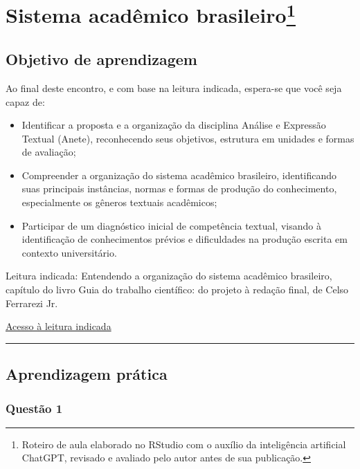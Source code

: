 \documentclass[
]{book}
\begin{document}
\chapter[Sistema acadêmico brasileiro]{\texorpdfstring{Sistema acadêmico brasileiro\footnote{Roteiro de aula elaborado no RStudio com o auxílio da inteligência artificial ChatGPT, revisado e avaliado pelo autor antes de sua publicação.}}{Sistema acadêmico brasileiro}}\label{sistema-acaduxeamico-brasileiro1}

\section{Objetivo de aprendizagem}\label{objetivo-de-aprendizagem}

Ao final deste encontro, e com base na leitura indicada, espera-se que você seja capaz de:

\begin{itemize}
\item
  Identificar a proposta e a organização da disciplina Análise e Expressão Textual (Anete), reconhecendo seus objetivos, estrutura em unidades e formas de avaliação;
\item
  Compreender a organização do sistema acadêmico brasileiro, identificando suas principais instâncias, normas e formas de produção do conhecimento, especialmente os gêneros textuais acadêmicos;
\item
  Participar de um diagnóstico inicial de competência textual, visando à identificação de conhecimentos prévios e dificuldades na produção escrita em contexto universitário.
\end{itemize}

Leitura indicada:
Entendendo a organização do sistema acadêmico brasileiro, capítulo do livro Guia do trabalho científico: do projeto à redação final, de Celso Ferrarezi Jr.

\href{vbk://9788572447638/epubcfi/6/14\%5B\%3Bvnd.vst.idref\%3Dcap1.xhtml\%5D}{Acesso à leitura indicada}

\begin{center}\rule{0.5\linewidth}{0.5pt}\end{center}

\section{Aprendizagem prática}\label{aprendizagem-pruxe1tica}

\subsection{Questão 1}\label{questuxe3o-1}
\end{document}
